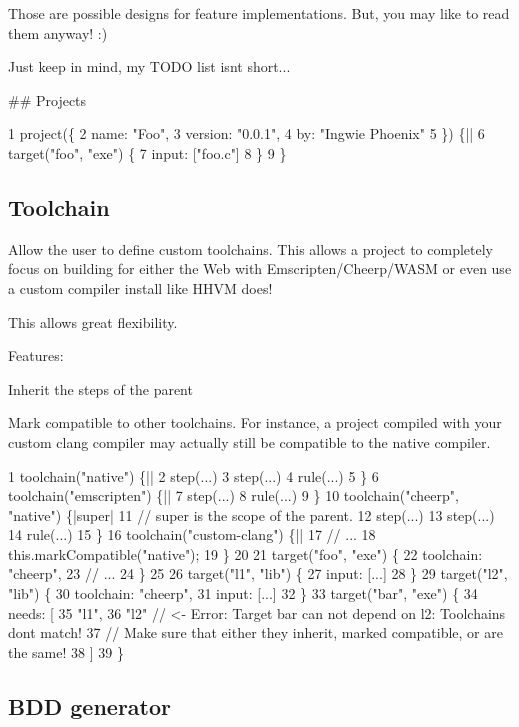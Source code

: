 Those are possible designs for feature implementations. But, you may like to read them anyway! \+:)

Just keep in mind, my T\+O\+DO list isn\textquotesingle{}t short...

\#\# Projects 
\begin{DoxyCode}
1 project(\{
2     name: "Foo",
3     version: "0.0.1",
4     by: "Ingwie Phoenix"
5 \}) \{||
6     target("foo", "exe") \{
7         input: ["foo.c"]
8     \}
9 \}
\end{DoxyCode}


\subsection*{Toolchain}

Allow the user to define custom toolchains. This allows a project to completely focus on building for either the Web with Emscripten/\+Cheerp/\+W\+A\+SM or even use a custom compiler install like H\+H\+VM does!

This allows great flexibility.

Features\+:
\begin{DoxyItemize}
\item Inherit the steps of the parent
\item Mark compatible to other toolchains. For instance, a project compiled with your custom clang compiler may actually still be compatible to the native compiler.
\end{DoxyItemize}


\begin{DoxyCode}
1 toolchain("native") \{||
2     step(...)
3     step(...)
4     rule(...)
5 \}
6 toolchain("emscripten") \{||
7     step(...)
8     rule(...)
9 \}
10 toolchain("cheerp", "native") \{|super|
11     // super is the scope of the parent.
12     step(...)
13     step(...)
14     rule(...)
15 \}
16 toolchain("custom-clang") \{||
17     // ...
18     this.markCompatible("native");
19 \}
20 
21 target("foo", "exe") \{
22     toolchain: "cheerp",
23     // ...
24 \}
25 
26 target("l1", "lib") \{
27     input: [...]
28 \}
29 target("l2", "lib") \{
30     toolchain: "cheerp",
31     input: [...]
32 \}
33 target("bar", "exe") \{
34     needs: [
35         "l1",
36         "l2"    // <- Error: Target bar can not depend on l2: Toolchains dont match!
37                 // Make sure that either they inherit, marked compatible, or are the same!
38     ]
39 \}
\end{DoxyCode}


\subsection*{B\+DD generator}

